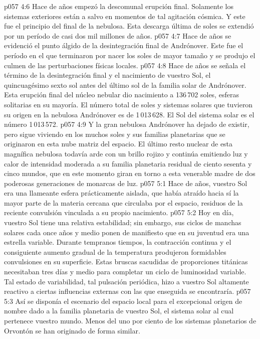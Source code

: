 \vs p057 4:6 \pc Hace  de años empezó la descomunal erupción final. Solamente los sistemas exteriores están a salvo en momentos de tal agitación cósmica. Y este fue el principio del final de la nebulosa. Esta descarga última de soles se extendió por un período de casi dos mil millones de años.
\vs p057 4:7 \pc Hace de años se evidenció el punto álgido de la desintegración final de Andrónover. Este fue el período en el que terminaron por nacer los soles de mayor tamaño y se produjo el culmen de las perturbaciones físicas locales.
\vs p057 4:8 \pc Hace  de años se señala el término de la desintegración final y el nacimiento de vuestro Sol, el quincuagésimo sexto sol antes del último sol de la familia solar de Andrónover. Esta erupción final del núcleo nebular dio nacimiento a 136\,702 soles, esferas solitarias en su mayoría. El número total de soles y sistemas solares que tuvieron su origen en la nebulosa Andrónover es de 1\,013\,628. El Sol del sistema solar es el número 1\,013\,572.
\vs p057 4:9 Y la gran nebulosa Andrónover ha dejado de existir, pero sigue viviendo en los muchos soles y sus familias planetarias que se originaron en esta nube matriz del espacio. El último resto nuclear de esta magnífica nebulosa todavía arde con un brillo rojizo y continúa emitiendo luz y calor de intensidad moderada a su familia planetaria residual de ciento sesenta y cinco mundos, que en este momento giran en torno a esta venerable madre de dos poderosas generaciones de monarcas de luz.
\vs p057 5:1 Hace  de años, vuestro Sol era una llameante esfera prácticamente aislada, que había atraído hacia sí la mayor parte de la materia cercana que circulaba por el espacio, residuos de la reciente convulsión vinculada a su propio nacimiento.
\vs p057 5:2 Hoy en día, vuestro Sol tiene una relativa estabilidad; sin embargo, sus ciclos de manchas solares cada once años y medio ponen de manifiesto que en su juventud era una estrella variable. Durante tempranos tiempos, la contracción continua y el consiguiente aumento gradual de la temperatura produjeron formidables convulsiones en su superficie. Estas bruscas sacudidas de proporciones titánicas necesitaban tres días y medio para completar un ciclo de luminosidad variable. Tal estado de variabilidad, tal pulsación periódica, hizo a vuestro Sol altamente reactivo a ciertas influencias externas con las que enseguida se encontraría.
\vs p057 5:3 Así se disponía el escenario del espacio local para el excepcional origen de  nombre dado a la familia planetaria de vuestro Sol, el sistema solar al cual pertenece vuestro mundo. Menos del uno por ciento de los sistemas planetarios de Orvontón se han originado de forma similar.

